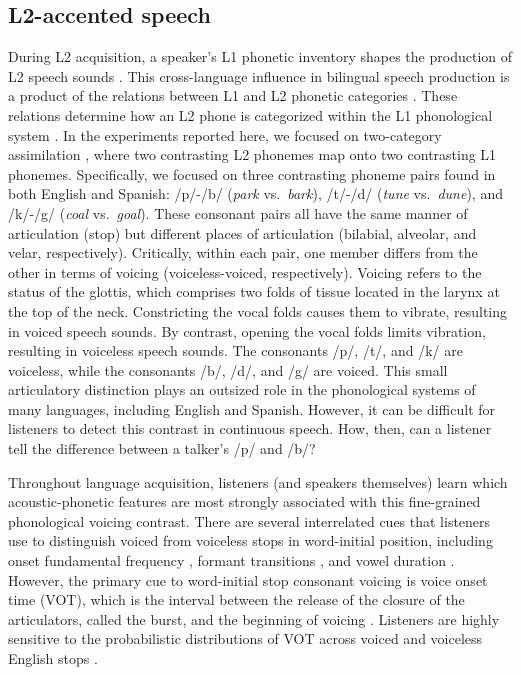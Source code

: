 \documentclass[preprint, 3p, authoryear]{elsarticle} %
\begin{document}
\hypertarget{l2-accented-speech}{%
\subsection{L2-accented speech}\label{l2-accented-speech}}

During L2 acquisition, a speaker's L1 phonetic inventory shapes the production of L2 speech sounds \citetext{\citealp{flege2021}; \citealp[for a recent review, see][]{nagle2022}}.
This cross-language influence in bilingual speech production is a product of the relations between L1 and L2 phonetic categories \citep{flege2007, flege2003}.
These relations determine how an L2 phone is categorized within the L1 phonological system \citep{best2001, best2007}.
In the experiments reported here, we focused on two-category assimilation \citep{best1994, tyler2014}, where two contrasting L2 phonemes map onto two contrasting L1 phonemes.
Specifically, we focused on three contrasting phoneme pairs found in both English and Spanish: /p/-/b/ (\emph{park} vs.~\emph{bark}), /t/-/d/ (\emph{tune} vs.~\emph{dune}), and /k/-/g/ (\emph{coal} vs.~\emph{goal}).
These consonant pairs all have the same manner of articulation (stop) but different places of articulation (bilabial, alveolar, and velar, respectively).
Critically, within each pair, one member differs from the other in terms of voicing (voiceless-voiced, respectively).
Voicing refers to the status of the glottis, which comprises two folds of tissue located in the larynx at the top of the neck.
Constricting the vocal folds causes them to vibrate, resulting in voiced speech sounds.
By contrast, opening the vocal folds limits vibration, resulting in voiceless speech sounds.
The consonants /p/, /t/, and /k/ are voiceless, while the consonants /b/, /d/, and /g/ are voiced.
This small articulatory distinction plays an outsized role in the phonological systems of many languages, including English and Spanish.
However, it can be difficult for listeners to detect this contrast in continuous speech.
How, then, can a listener tell the difference between a talker's /p/ and /b/?

Throughout language acquisition, listeners (and speakers themselves) learn which acoustic-phonetic features are most strongly associated with this fine-grained phonological voicing contrast.
There are several interrelated cues that listeners use to distinguish voiced from voiceless stops in word-initial position, including onset fundamental frequency \citep{whalen1993}, formant transitions \citep{cooper1974, benki2001}, and vowel duration \citep{port1982, viswanathan2020}.
However, the primary cue to word-initial stop consonant voicing is voice onset time (VOT), which is the interval between the release of the closure of the articulators, called the burst, and the beginning of voicing \citep{lisker1964, cho1999, chodroff2019}.
Listeners are highly sensitive to the probabilistic distributions of VOT across voiced and voiceless English stops \citep{clayards2008}.
\end{document}
